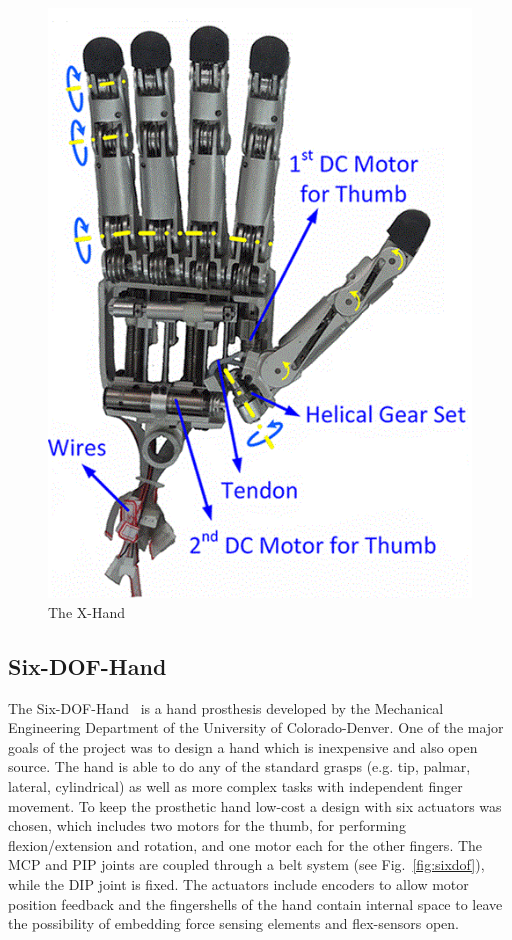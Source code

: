 \documentclass[a4paper, 10pt, conference]{ieeeconf}      %
\begin{document}
\begin{figure}[h]

	\centering
	\includegraphics[scale=0.32]{images/XHand}
	
	\caption{The X-Hand}
\end{figure}

\subsection{Six-DOF-Hand}

The Six-DOF-Hand~\cite{6dofhand} is a hand prosthesis developed by the Mechanical Engineering Department of the University of Colorado-Denver. One of the major goals of the project was to design a hand which is inexpensive and also open source. The hand is able to do any of the standard grasps (e.g. tip, palmar, lateral, cylindrical) as well as more complex tasks with independent finger movement. To keep the prosthetic hand low-cost a design with six actuators was chosen, which includes two motors for the thumb, for performing flexion/extension and rotation, and one motor each for the other fingers. The MCP and PIP joints are coupled through a belt system (see Fig.~\ref{fig:sixdof}), while the DIP joint is fixed. The actuators include encoders to allow motor position feedback and the fingershells of the hand contain internal space to leave the possibility of embedding force sensing elements and flex-sensors open.
\end{document}
